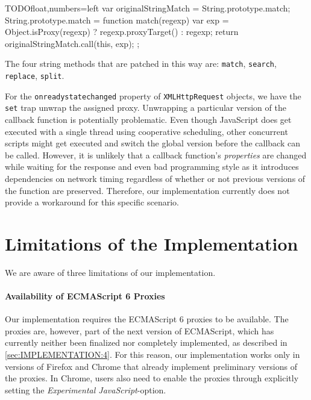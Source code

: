 \begin{code}{TODO}{float,numbers=left}
var originalStringMatch = String.prototype.match;
String.prototype.match = function match(regexp) {
    var exp = Object.isProxy(regexp) ?
        regexp.proxyTarget() : regexp;
    return originalStringMatch.call(this, exp);
};
\end{code}
\iffalse
\end{verbatim}\fi

The four string methods that are patched in this way are: \lstinline{match}, \lstinline{search}, \lstinline{replace}, \lstinline{split}.

For the \lstinline{onreadystatechanged} property of \lstinline{XMLHttpRequest} objects, we have the \lstinline{set} trap unwrap the assigned proxy.
Unwrapping a particular version of the callback function is potentially problematic.
Even though JavaScript does get executed with a single thread using cooperative scheduling, other concurrent scripts might get executed and switch the global version before the callback can be called.
However, it is unlikely that a callback function's \emph{properties} are changed while waiting for the response and even bad programming style as it introduces dependencies on network timing regardless of whether or not previous versions of the function are preserved.
Therefore, our implementation currently does not provide a workaround for this specific scenario. 





\section{Limitations of the Implementation}

We are aware of three limitations of our implementation.

\paragraph{Availability of ECMAScript 6 Proxies}
Our implementation requires the ECMAScript 6 proxies to be available.
The proxies are, however, part of the next version of ECMAScript, which has currently neither been finalized nor completely implemented, as described in \ref{sec:IMPLEMENTATION:4}.
For this reason, our implementation works only in versions of Firefox and Chrome that already implement preliminary versions of the proxies.
In Chrome, users also need to enable the proxies through explicitly setting the \emph{Experimental JavaScript}-option.

